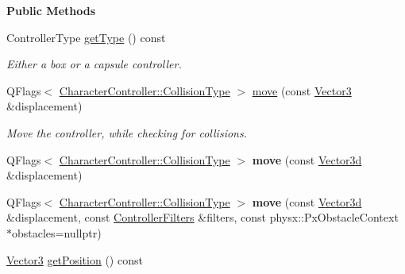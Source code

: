 \begin{Indent}\textbf{ Public Methods}\par
\begin{DoxyCompactItemize}
\item 
\mbox{\label{classrev_1_1_character_controller_a555afaeade7bf28aa4815b696cb990c8}} 
Controller\+Type \mbox{\hyperlink{classrev_1_1_character_controller_a555afaeade7bf28aa4815b696cb990c8}{get\+Type}} () const
\begin{DoxyCompactList}\small\item\em Either a box or a capsule controller. \end{DoxyCompactList}\item 
Q\+Flags$<$ \mbox{\hyperlink{classrev_1_1_character_controller_ac4d525bc4df0feaaef505f1756ca7b11}{Character\+Controller\+::\+Collision\+Type}} $>$ \mbox{\hyperlink{classrev_1_1_character_controller_ae36c3695f38bc82cce6e96478879719b}{move}} (const \mbox{\hyperlink{classrev_1_1_vector}{Vector3}} \&displacement)
\begin{DoxyCompactList}\small\item\em Move the controller, while checking for collisions. \end{DoxyCompactList}\item 
\mbox{\label{classrev_1_1_character_controller_a7cfab0a7174d6d396a2b3dfdec3408f8}} 
Q\+Flags$<$ \mbox{\hyperlink{classrev_1_1_character_controller_ac4d525bc4df0feaaef505f1756ca7b11}{Character\+Controller\+::\+Collision\+Type}} $>$ {\bfseries move} (const \mbox{\hyperlink{classrev_1_1_vector}{Vector3d}} \&displacement)
\item 
\mbox{\label{classrev_1_1_character_controller_a02eb8ed2d6d559c7d391ba9d53a9033a}} 
Q\+Flags$<$ \mbox{\hyperlink{classrev_1_1_character_controller_ac4d525bc4df0feaaef505f1756ca7b11}{Character\+Controller\+::\+Collision\+Type}} $>$ {\bfseries move} (const \mbox{\hyperlink{classrev_1_1_vector}{Vector3d}} \&displacement, const \mbox{\hyperlink{classrev_1_1_controller_filters}{Controller\+Filters}} \&filters, const physx\+::\+Px\+Obstacle\+Context $\ast$obstacles=nullptr)
\item 
\mbox{\label{classrev_1_1_character_controller_a2508774e29f0470edcea8745fd86352d}} 
\mbox{\hyperlink{classrev_1_1_vector}{Vector3}} \mbox{\hyperlink{classrev_1_1_character_controller_a2508774e29f0470edcea8745fd86352d}{get\+Position}} () const

\end{DoxyCompactItemize}
\end{Indent}
